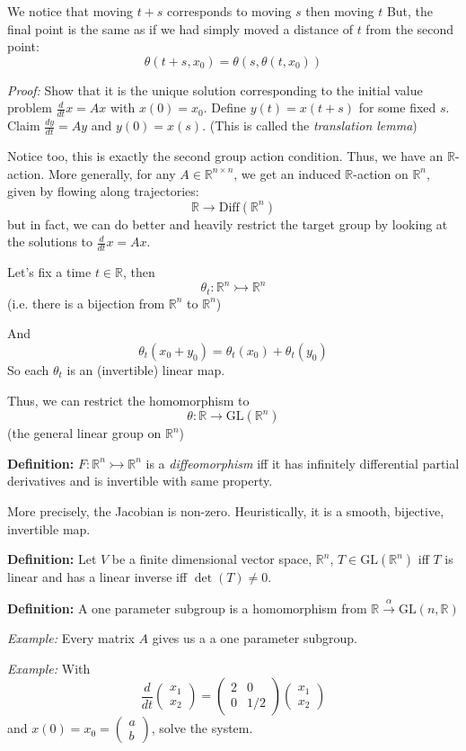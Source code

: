 \documentclass[12pt]{article}
\newcommand{\R}{\mathbb{R}}
\newcommand{\GL}{\text{GL}}
\begin{document}
    We notice that moving $t + s$ corresponds to moving $s$ then moving $t$ But, the final point is the same as if we had simply moved a distance of $t$ from the second point: 
    \[\theta(t + s, x_0) = \theta(s, \theta(t, x_0))\]
 
    \emph{Proof:} Show that it is the unique solution corresponding to the initial value problem $\frac{d}{dt}x = Ax$ with $x(0) = x_0$. Define $y(t) = x(t + s)$ for some fixed $s$. Claim $\frac{dy}{dt} = Ay$ and $y(0) = x(s)$. (This is called the \emph{translation lemma})

    Notice too, this is exactly the second group action condition. Thus, we have an $\R$-action. More generally, for any $A \in \R^{n\times n}$, we get an induced $\R$-action on $\R^n$, given by flowing along trajectories:
    \[\R \to \text{Diff}(\R^n)\]
    but in fact, we can do better and heavily restrict the target group by looking at the solutions to $\frac{d}{dt}x = Ax$. 

    Let's fix a time $t \in \R$, then 
    \[\theta_t: \R^n \rightarrowtail \R^n\]
    (i.e. there is a bijection from $\R^n$ to $\R^n$)

    And 
    \[\theta_t(x_0 + y_0) = \theta_t(x_0) + \theta_t(y_0)\] 
    So each $\theta_t$ is an (invertible) linear map. 

    Thus, we can restrict the homomorphism to 
    \[\theta: \R \to \GL(\R^n)\] 
    (the general linear group on $\R^n$) 

    \textbf{Definition:} $F: \R^n \rightarrowtail \R^n$ is a \emph{diffeomorphism} iff it has infinitely differential partial derivatives and is invertible with same property. 

    More precisely, the Jacobian is non-zero. Heuristically, it is a smooth, bijective, invertible map. 

    \textbf{Definition:} Let $V$ be a finite dimensional vector space, $\R^n$, $T \in \GL(\R^n)$ iff $T$ is linear and has a linear inverse iff $\det(T) \neq 0$.  

    \textbf{Definition:} A one parameter subgroup is a homomorphism from $\R \overset{\alpha}{\longrightarrow} \GL(n, \R)$ 
    
    \emph{Example:} Every matrix $A$ gives us a a one parameter subgroup.

    \emph{Example:} With
    \[\frac{d}{dt}\begin{pmatrix}
        x_1\\x_2
    \end{pmatrix} = \begin{pmatrix}
        2 & 0\\ 
        0 & 1/2
    \end{pmatrix} \begin{pmatrix}
        x_1\\ x_2
    \end{pmatrix}\]
    and $x(0) = x_0 = \begin{pmatrix}
        a\\b
    \end{pmatrix}$, solve the system. 
    
\end{document}

